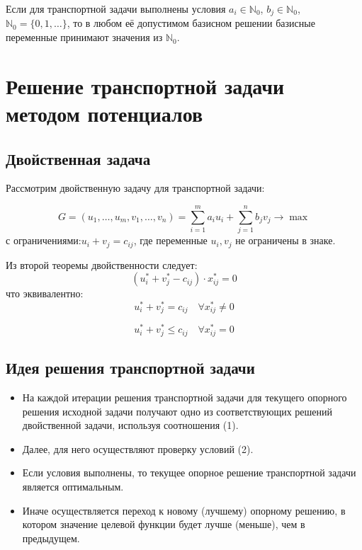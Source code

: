 \documentclass[17pt]{extarticle}
\begin{document}
\begin{theorem}
    Если для транспортной задачи выполнены условия \( a_i \in \mathbb{N}_0 \), \( b_j \in \mathbb{N}_0 \), \( \mathbb{N}_0 = \{0, 1, \ldots\} \), то в любом её допустимом базисном решении базисные переменные принимают значения из \( \mathbb{N}_0 \).
\end{theorem}


\section{Решение транспортной задачи методом потенциалов}

\subsection{Двойственная задача}

Рассмотрим двойственную задачу для транспортной задачи:

\[
    G = (u_1, \ldots, u_m, v_1, \ldots, v_n) = \sum_{i=1}^m a_i u_i + \sum_{j=1}^n b_j v_j \rightarrow \max
\]
с ограничениями:$u_i + v_j = c_{ij}$, где переменные \( u_i, v_j \) не ограничены в знаке.

Из второй теоремы двойственности следует:
\[
    (u_i^* + v_j^* - c_{ij}) \cdot x_{ij}^* = 0
\]
что эквивалентно:
\[
    u_i^* + v_j^* = c_{ij} \quad \forall x_{ij}^* \neq 0 \tag{1}
\]

\[
    u_i^* + v_j^* \leq c_{ij} \quad \forall x_{ij}^* = 0 \tag{2}
\]

\subsection{Идея решения транспортной задачи}
\begin{itemize}
    \item На каждой итерации решения транспортной задачи для текущего опорного решения исходной задачи получают одно из соответствующих решений двойственной задачи, используя соотношения (1).
    \item Далее, для него осуществляют проверку условий (2).
    \item Если условия выполнены, то текущее опорное решение транспортной задачи является оптимальным.
    \item Иначе осуществляется переход к новому (лучшему) опорному решению, в котором значение целевой функции будет лучше (меньше), чем в предыдущем.
\end{itemize}
\end{document}
